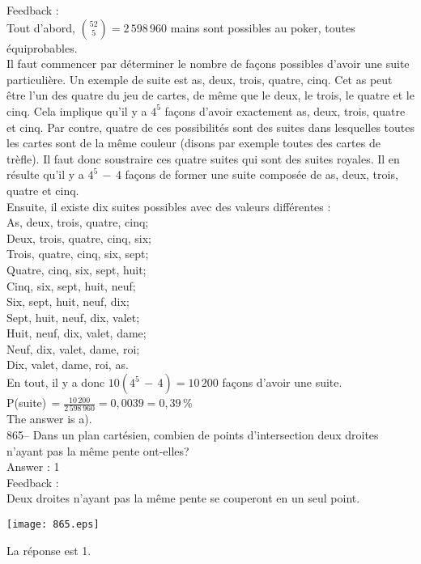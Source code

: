\documentclass[letterpaper, 12pt]{article}
\begin{document}
Feedback : \\
Tout d'abord, $\binom{52}{5}=2\,598\,960$ mains sont possibles au poker,
toutes \'equiprobables.  \\
Il faut commencer par d\'eterminer le nombre de fa\c cons possibles d'avoir
une suite particuli\`ere.  Un exemple de suite est as, deux, trois, quatre,
cinq.  Cet as peut \^etre l'un des quatre du jeu de cartes, de m\^eme que le
deux, le trois, le quatre et le cinq.  Cela implique qu'il y a $4^{5}$ fa\c
cons d'avoir exactement as, deux, trois, quatre et cinq.  Par contre, quatre
de ces possibilit\'es sont des suites dans lesquelles toutes les cartes sont
de la m\^eme couleur (disons par exemple toutes des cartes de tr\`efle).  Il
faut donc soustraire ces quatre suites qui sont des suites royales.  Il en
r\'esulte qu'il y a $4^{5}\,-\,4$ fa\c cons de former une suite compos\'ee
de as, deux, trois, quatre et cinq.  \\
Ensuite, il existe dix suites possibles avec des valeurs diff\'erentes :\\
As, deux, trois, quatre, cinq;\\
Deux, trois, quatre, cinq, six;\\
Trois, quatre, cinq, six, sept;\\
Quatre, cinq, six, sept, huit;\\
Cinq, six, sept, huit, neuf;\\
Six, sept, huit, neuf, dix;\\
Sept, huit, neuf, dix, valet;\\
Huit, neuf, dix, valet, dame;\\
Neuf, dix, valet, dame, roi;\\
Dix, valet, dame, roi, as.\\

En tout, il y a donc $10(4^{5}\,-\,4)=10\,200$ fa\c cons d'avoir une suite.
\\[2mm]
P(suite)$\,=\frac{10\,200}{2\,598\,960}=0,0039=0,39\,\%$\\[2mm]
The answer is a).\\

865-- Dans un plan cart\'esien, combien de points d'intersection deux
droites n'ayant pas la m\^eme pente ont-elles?\\

Answer : 1\\

Feedback : \\
Deux droites n'ayant pas la m\^eme pente se couperont en un seul
point.   \begin{center}
    \texttt{[image: 865.eps]}
    \end{center}  La
r\'eponse est 1.\\
\end{document}
